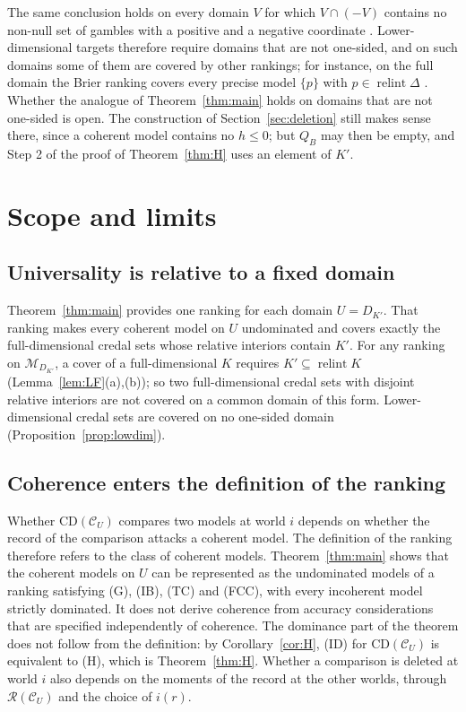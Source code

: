 \documentclass[11pt]{article}
\newcommand{\M}{\mathcal{M}}
\newcommand{\CC}{\mathcal{C}}
\newcommand{\RR}{\mathcal{R}}
\newcommand{\CD}{\mathrm{CD}}
\DeclareMathOperator{\relint}{relint}
\theoremstyle{plain}
\theoremstyle{definition}
\theoremstyle{remark}
\begin{document}
The same conclusion holds on every domain $V$ for which $V\cap(-V)$ contains no non-null
set of gambles with a positive and a negative coordinate
\cite[Prop.~2.10]{KCM}. Lower-dimensional targets therefore require domains that are
not one-sided, and on such domains some of them are covered by other rankings; for
instance, on the full domain the Brier ranking covers every precise model $\{p\}$ with
$p\in\relint\Delta$ \cite[Cor.~5.9]{KCM}. Whether the analogue of
Theorem~\ref{thm:main} holds on domains that are not one-sided is open. The construction of
Section~\ref{sec:deletion} still makes sense there, since a coherent model contains no
$h\le0$; but $Q_B$ may then be empty, and Step 2 of the proof of Theorem~\ref{thm:H} uses
an element of $K'$.

\section{Scope and limits}\label{sec:scope}

\subsection{Universality is relative to a fixed domain}

Theorem~\ref{thm:main} provides one ranking for each domain $U=D_{K'}$. That ranking makes
every coherent model on $U$ undominated and covers exactly the full-dimensional credal
sets whose relative interiors contain $K'$. For any ranking on $\M_{D_{K'}}$, a cover of
a full-dimensional $K$ requires $K'\subseteq\relint K$ (Lemma~\ref{lem:LF}(a),(b)); so two
full-dimensional credal sets with disjoint relative interiors are not covered on a common
domain of this form. Lower-dimensional credal sets are covered on no one-sided domain
(Proposition~\ref{prop:lowdim}).

\subsection{Coherence enters the definition of the ranking}

Whether $\CD(\CC_U)$ compares two models at world $i$ depends on whether the record of the
comparison attacks a coherent model. The definition of the ranking therefore refers to
the class of coherent models. Theorem~\ref{thm:main} shows that the coherent models on $U$ can be
represented as the undominated models of a ranking satisfying (G), (IB), (TC) and (FCC), with every incoherent model strictly dominated. It does not derive coherence
from accuracy considerations that are specified independently of coherence. The
dominance part of the theorem does not follow from the definition: by
Corollary~\ref{cor:H}, (ID) for $\CD(\CC_U)$ is equivalent to (H), which is
Theorem~\ref{thm:H}. Whether a comparison is deleted at world $i$ also depends on the
moments of the record at the other worlds, through $\RR(\CC_U)$ and the choice of $i(r)$.
\end{document}
